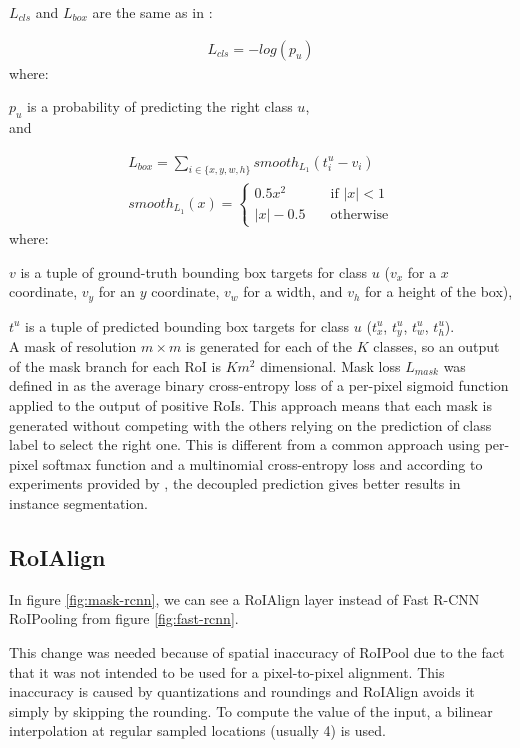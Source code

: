 \documentclass[journal, onecolumn, a4paper]{IEEEtran}
\begin{document}
$L_{cls}$ and $L_{box}$ are the same as in \cite{fast-rcnn}:

\begin{gather*}
L_{cls} = - log(p_u)
\end{gather*}
where:

$p_u$ is a probability of predicting the right class $u$,\\
and

\begin{gather*}
L_{box} = \sum\limits_{i \in \{x, y, w, h\}} smooth_{L_1}(t_i^u - v_i)\\
smooth_{L_1}(x) = \begin{cases}
	0.5 x^2 & \quad \text{if } |x| < 1\\
	|x| - 0.5 & \quad \text{otherwise}
\end{cases}
\end{gather*}
where:

$v$ is a tuple of ground-truth bounding box targets for class $u$ ($v_x$ for a $x$ coordinate, $v_y$ for an $y$ coordinate, $v_w$ for a width, and $v_h$ for a height of the box),

$t^u$ is a tuple of predicted bounding box targets for class $u$ ($t_x^u$, $t_y^u$, $t_w^u$, $t_h^u$).\\ 

A mask of resolution $m \times m$ is generated for each of the $K$ classes, so an output of the mask branch for each RoI is $K m^2$ dimensional. Mask loss $L_{mask}$ was defined in \cite{mask-rcnn} as the average binary cross-entropy loss of a per-pixel sigmoid function applied to the output of positive RoIs. This approach means that each mask is generated without competing with the others relying on the prediction of class label to select the right one. This is different from a common approach using per-pixel softmax function and a multinomial cross-entropy loss and according to experiments provided by \cite{mask-rcnn}, the decoupled prediction gives better results in instance segmentation. 

\subsection{RoIAlign}

In figure \ref{fig:mask-rcnn}, we can see a RoIAlign layer instead of Fast R-CNN RoIPooling from figure \ref{fig:fast-rcnn}. 

This change was needed because of spatial inaccuracy of RoIPool due to the fact that it was not intended to be used for a pixel-to-pixel alignment. This inaccuracy is caused by quantizations and roundings and RoIAlign avoids it simply by skipping the rounding. To compute the value of the input, a bilinear interpolation at regular sampled locations (usually 4) is used. 
\end{document}
